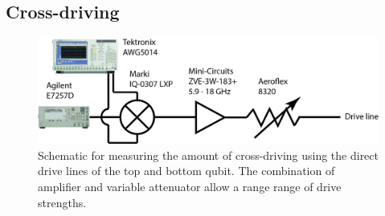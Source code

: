     \subsection{Cross-driving}
      \label{ssec:cross-driving}

      \begin{figure}[tb]
        \centering
        \includegraphics[width=.8\textwidth]{../Figures/Exploring frequency re-use/cross-driving_setup.jpg}
        \caption{Schematic for measuring the amount of cross-driving using the direct drive lines of the top and bottom qubit. The combination of amplifier and variable attenuator allow a range range of drive strengths.}
        \label{fig:cross-driving schematic}
      \end{figure}

